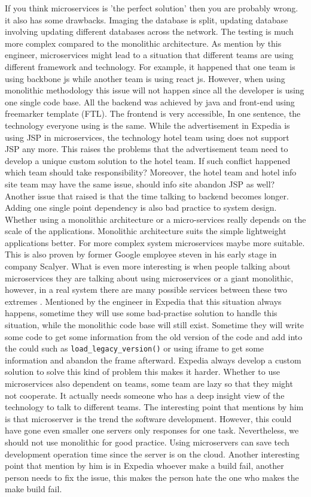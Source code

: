 \documentclass[11pt]{article}
\begin{document}
If you think microservices is 'the perfect solution' then you are probably wrong. it also has some drawbacks. Imaging the database is split, updating database involving updating different databases across the network. The testing is much more complex compared to the monolithic architecture. As mention by this engineer, microservices might lead to a situation that different teams are using different framework and technology. For example, it happened that one team is using backbone js while another team is using react js. However, when using monolithic methodology this issue will not happen since all the developer is using one single code base. All the backend was achieved by java and front-end using freemarker template (FTL). The frontend is very accessible, In one sentence, the technology everyone using is the same. While the advertisement in Expedia is using JSP in microservices, the technology hotel team using does not support JSP any more. This raises the problems that the advertisement team need to develop a unique custom solution to the hotel team. If such conflict happened which team should take responsibility? Moreover, the hotel team and hotel info site team may have the same issue, should info site abandon JSP as well? Another issue that raised is that the time talking to backend becomes longer. Adding one single point dependency is also bad practice to system design. \\[10px]
Whether using a monolithic architecture or a micro-services really depends on the scale of the applications. 
Monolithic architecture suits the simple lightweight applications better. 
For more complex system microservices maybe more suitable. 
This is also proven by former Google employee steven in his early stage in company Scalyer. 
What is even more interesting is when people talking about microservices they are talking about 
using microservices or a giant monolithic, however, in a real system there are many possible services 
between these two extremes \cite{no9}. Mentioned by the engineer in Expedia that this situation always happens, 
sometime they will use some bad-practise solution to handle this situation, while the monolithic code base will still exist. 
Sometime they will write some code to get some information from the old version of the code and add into the could 
such as \texttt{load\_legacy\_version()} or using iframe to get some information and abandon the frame afterward. 
Expedia always develop a custom solution to solve this kind of problem this makes it harder. 
Whether to use microservices also dependent on teams, some team are lazy so that they might not cooperate. It actually needs someone who has a deep insight view of the technology to talk to different teams. The interesting point that mentions by him is that microserver is the trend the software development. However, this could have gone even smaller one servers only responses for one task. Nevertheless, we should not use monolithic for good practice. Using microservers can save tech development operation time since the server is on the cloud.  Another interesting point that mention by him is in Expedia whoever make a build fail, another person needs to fix the issue, this makes the person hate the one who makes the make build fail.
\end{document}
